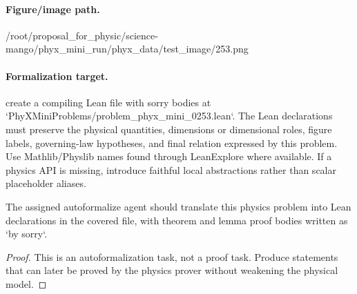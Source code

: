 \paragraph{Figure/image path.}
/root/proposal\_for\_physic/science-mango/phyx\_mini\_run/phyx\_data/test\_image/253.png

\paragraph{Formalization target.}
create a compiling Lean file with sorry bodies at `PhyXMiniProblems/problem\_phyx\_mini\_0253.lean`. The Lean declarations must preserve the physical quantities, dimensions or dimensional roles, figure labels, governing-law hypotheses, and final relation expressed by this problem.
Use Mathlib/Physlib names found through LeanExplore where available. If a physics API is missing, introduce faithful local abstractions rather than scalar placeholder aliases.

\begin{theorem}
\label{thm:physics:phyx_mini_0253:target}
The assigned autoformalize agent should translate this physics problem into Lean declarations in the covered file, with theorem and lemma proof bodies written as `by sorry`.
\end{theorem}
\begin{proof}
This is an autoformalization task, not a proof task. Produce statements that can later be proved by the physics prover without weakening the physical model.
\end{proof}

